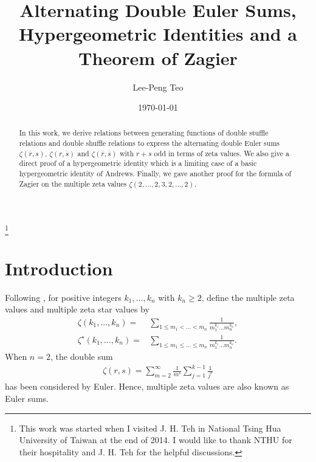 \documentclass[reqno]{amsart}
\theoremstyle{definition}
\theoremstyle{remark}
\numberwithin{equation}{section}
\begin{document}
\title[Euler Sums and a Theorem of Zagier]{Alternating Double Euler Sums, Hypergeometric Identities and a Theorem of Zagier}
\author{Lee-Peng Teo}

\address{Department of  Mathematics, Xiamen University Malaysia, Jalan Sunsuria, Bandar Sunsuria, 43900, Sepang, Selangor, Malaysia. }


\thanks{This work was started when I visited   J. H. Teh in National Tsing Hua University of Taiwan at the end of 2014. I would like to thank NTHU for their hospitality and J. H. Teh for the helpful discussions. }


\date{\today}


\begin{abstract}
In this work, we derive relations between generating functions of double stuffle relations and double shuffle relations to express the alternating double Euler sums $\zeta\left(\overline{r}, s\right)$, $\zeta\left(r, \overline{s}\right)$ and $\zeta\left(\overline{r}, \overline{s}\right)$ with $r+s$ odd in terms of zeta values. We also give a direct proof of a hypergeometric identity which is a limiting case of a basic hypergeometric identity of Andrews. Finally, we gave  another   proof for the formula of Zagier on the   multiple zeta values $\zeta(2,\ldots,2,3,2,\ldots,2)$.
\end{abstract}
\maketitle

\section{Introduction}

Following \cite{1}, for positive integers $k_1, \ldots, k_n$ with $k_n\geq 2$, define the multiple zeta values and multiple zeta star values by
\begin{align}
\zeta\left(k_1, \ldots, k_n\right)=&\sum_{1\leq m_1< \ldots< m_n }\frac{1}{m_1^{k_1}\ldots m_n^{k_n}},\label{eq1}\\
\zeta^{\star}\left(k_1, \ldots, k_n\right)=&\sum_{1\leq m_1\leq \ldots\leq m_n }\frac{1}{m_1^{k_1}\ldots m_n^{k_n}}.\label{eq2}
\end{align}
When $n=2$, the double sum
\begin{align}\label{eq3}
\zeta(r,s)=\sum_{m=2}^{\infty}\frac{1}{m^s}\sum_{j=1}^{k-1}\frac{1}{j^r }
\end{align}has been considered by Euler. Hence, multiple zeta values are also known as Euler sums.
\end{document}
